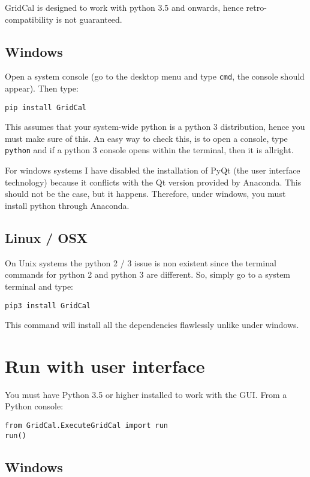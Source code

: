 \documentclass[11pt,fleqn]{book} %
\begin{document}
GridCal is designed to work with python 3.5 and onwards, hence retro-compatibility is not guaranteed.

\subsection{Windows}

Open a system console (go to the desktop menu and type \verb|cmd|, the console should appear). Then type:\newline

\verb|pip install GridCal| \newline

This assumes that your system-wide python is a python 3 distribution, hence you must make sure of this. An easy way to check this, is to open a console, type \verb|python| and if a python 3 console opens within the terminal, then it is allright.

For windows systems I have disabled the installation of PyQt (the user interface technology) because it conflicts with the Qt version provided by Anaconda. This should not be the case, but it happens. Therefore, under windows, you must install python through Anaconda.

\subsection{Linux / OSX}

On Unix systems the python 2 / 3 issue is non existent since the terminal commands for python 2 and python 3 are different. So, simply go to a system terminal and type:\newline

\verb|pip3 install GridCal|  \newline

This command will install all the dependencies flawlessly unlike under windows.


\section{Run with user interface}

You must have Python 3.5 or higher installed to work with the GUI. From a Python console:

\begin{verbatim}
from GridCal.ExecuteGridCal import run
run()
\end{verbatim}

\subsection{Windows}
\end{document}
